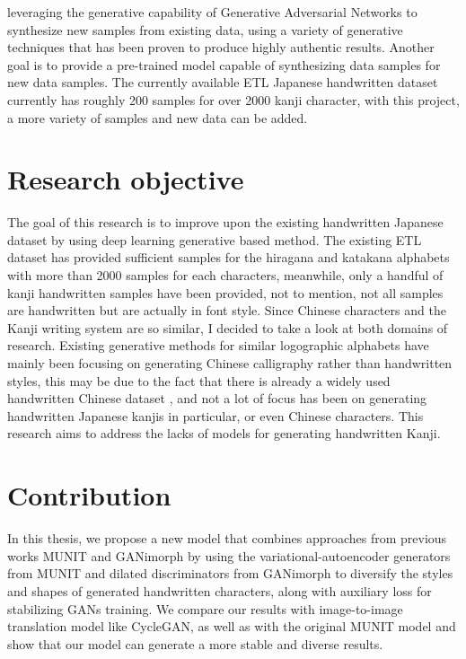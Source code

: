 \documentclass[12pt]{report}
\begin{document}
leveraging the generative capability of Generative Adversarial Networks to
synthesize new samples from existing data, using a variety of generative techniques
that has been proven to produce highly authentic results. Another goal is to provide
a pre-trained model capable of synthesizing data samples for new data samples.
The currently available ETL Japanese handwritten dataset \cite{etl} currently has roughly 200
samples for over 2000 kanji character, with this project, a more variety of samples
and new data can be added.

\section{Research objective}
The goal of this research is to improve upon the existing handwritten Japanese dataset by 
using deep learning generative based method.
The existing ETL dataset has provided sufficient samples for the hiragana and
katakana alphabets with more than 2000 samples for each characters, meanwhile,
only a handful of kanji handwritten samples have been provided, not to mention, not
all samples are handwritten but are actually in font style.
Since Chinese characters and the Kanji writing system are so similar, I decided to
take a look at both domains of research. Existing generative methods for similar
logographic alphabets have mainly been focusing on generating Chinese calligraphy
rather than handwritten styles, this may be due to the fact that there is already a
widely used handwritten Chinese dataset \cite{casia}, and not a lot of focus has been on
generating handwritten Japanese kanjis in particular, or even Chinese characters. This
research aims to address the lacks of models for generating handwritten Kanji.

\section{Contribution}
In this thesis, we propose a new model that combines approaches from previous works MUNIT\cite{munit} and GANimorph\cite{ganimorph} by using the variational-autoencoder generators from MUNIT and dilated discriminators from GANimorph to diversify the styles and shapes of generated handwritten characters, along with auxiliary loss for stabilizing GANs training. We compare our results with image-to-image translation model like CycleGAN\cite{cycle-gan}, as well as with the original MUNIT\cite{munit} model and show that our model can generate a more stable and diverse results.
\end{document}
